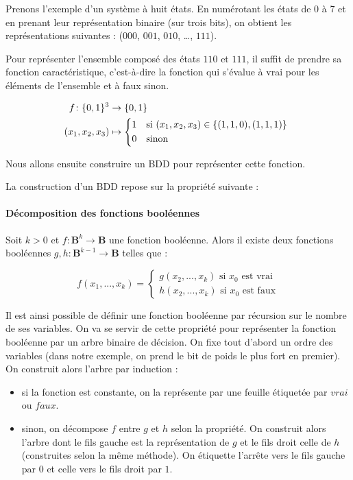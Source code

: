 Prenons l'exemple d'un système à huit états. En numérotant les états de 0 à 7 et
en prenant leur représentation binaire (sur trois bits), on obtient les
représentations suivantes : (\(000\), \(001\), \(010\), \dots, \(111\)).


Pour représenter l'ensemble composé des états \(110\) et \(111\), il suffit
de prendre sa fonction caractéristique, c'est-à-dire la fonction qui s'évalue à
vrai pour les éléments de l'ensemble et à faux sinon.

\begin{align}
  f \colon \{0, 1\}^3 & \to \{0, 1\} \\
  (x_1, x_2, x_3) & \mapsto
  \begin{cases*}
    1 & si \((x_1, x_2, x_3) \in \{(1,1,0), (1,1,1)\}\) \\
    0 & sinon
  \end{cases*}
\end{align}

Nous allons ensuite construire un \ac{BDD} pour représenter cette fonction.

La construction d'un \ac{BDD} repose sur la propriété suivante :

\paragraph{Décomposition des fonctions booléennes}
Soit \(k > 0\) et \(f: \mathbf{B}^k \to \mathbf{B}\) une
fonction booléenne. Alors il existe deux fonctions booléennes
\(g, h : \mathbf{B}^{k-1} \to \mathbf{B}\) telles que :

\[
f(x_1, ..., x_k) =
\begin{cases*}
  g(x_2, ..., x_k) \text{ si $x_0$ est vrai}\\
  h(x_2, ..., x_k) \text{ si $x_0$ est faux}
\end{cases*}
\]

Il est ainsi possible de définir une fonction booléenne par récursion
sur le nombre de ses variables. On va se servir de cette propriété pour
représenter la fonction booléenne par un arbre binaire de décision. On
fixe tout d'abord un ordre des variables (dans notre exemple, on prend
le bit de poids le plus fort en premier). On construit alors l'arbre
par induction :

\begin{itemize}
\item
  si la fonction est constante, on la représente par une feuille
  étiquetée par \(vrai\) ou \(faux\).
\item
  sinon, on décompose \(f\) entre \(g\) et \(h\) selon la propriété. On
  construit alors l'arbre dont le fils gauche est la représentation de
  \(g\) et le fils droit celle de \(h\) (construites selon la même méthode).
  On étiquette l'arrête vers le fils gauche par \(0\) et celle vers le fils
  droit par \(1\).
\end{itemize}

